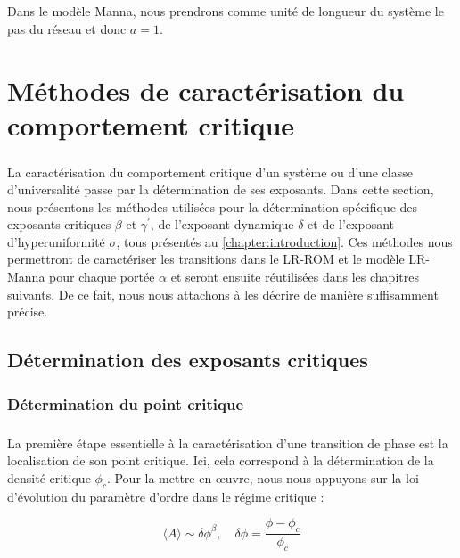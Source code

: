 \subparagraph{}Dans le modèle Manna, nous prendrons comme unité de longueur du système le pas du réseau et donc $a=1$.

\section{Méthodes de caractérisation du comportement critique}

\label{sec:methodchap2}

\subparagraph{}La caractérisation du comportement critique d'un système ou d'une classe d'universalité passe par la détermination de ses exposants. Dans cette section, nous présentons les méthodes utilisées pour la détermination spécifique des exposants critiques $\beta$ et $\gamma^\prime$, de l'exposant dynamique $\delta$ et de l'exposant d'hyperuniformité $\sigma$, tous présentés au \autoref{chapter:introduction}. Ces méthodes nous permettront de caractériser les transitions dans le LR-ROM et le modèle LR-Manna pour chaque portée $\alpha$ et seront ensuite réutilisées dans les chapitres suivants. De ce fait, nous nous attachons à les décrire de manière suffisamment précise.

\subsection{Détermination des exposants critiques}

\label{sec:MethodesExposants}

\subsubsection{Détermination du point critique}

\subparagraph{}La première étape essentielle à la caractérisation d'une transition de phase est la localisation de son point critique. Ici, cela correspond à la détermination de la densité critique $\phi_c$. Pour la mettre en œuvre, nous nous appuyons sur la loi d'évolution du paramètre d'ordre dans le régime critique :

\begin{equation}
	\langle A \rangle \sim \delta\phi^\beta, \quad \delta\phi = \frac{\phi-\phi_c}{\phi_c}
\end{equation}

